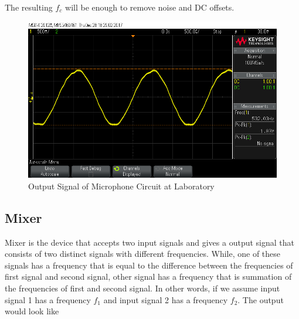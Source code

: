 \documentclass[paper]{IEEEtran}
\begin{document}
The resulting $f_c$ will be enough to remove noise and DC offsets.

\begin{figure}[h!]
\setlength{\unitlength}{\textwidth}
\center 
\includegraphics[width=0.45\unitlength]{mic_osc.png}
\caption{\label{fig:micout} Output Signal of Microphone Circuit at Laboratory }
\end{figure}	





	
	
\subsection{Mixer}
	
	Mixer is the device that accepts two input signals and gives a output signal that consists of two distinct signals with different frequencies. While, one of these signals has a frequency that is equal to the difference between the frequencies of first signal and second signal, other signal has a frequency that is summation of the frequencies of first and second signal. In other words, if we assume input signal 1 has a frequency $f_1$ and input signal 2 has a frequency $f_2$. The output would look like  
	
\end{document}
